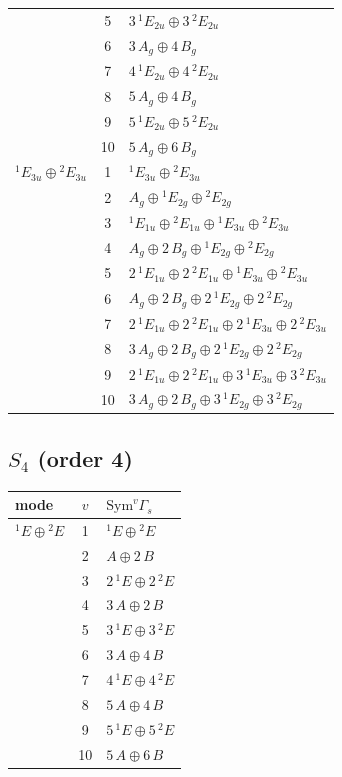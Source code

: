 \documentclass[11pt]{article}
\begin{document}
\begin{longtable}{l c p{}}
 & 5 & $3\,{}^{1}E_{2u}\oplus 3\,{}^{2}E_{2u}$\\
 & 6 & $3\,A_{g}\oplus 4\,B_{g}$\\
 & 7 & $4\,{}^{1}E_{2u}\oplus 4\,{}^{2}E_{2u}$\\
 & 8 & $5\,A_{g}\oplus 4\,B_{g}$\\
 & 9 & $5\,{}^{1}E_{2u}\oplus 5\,{}^{2}E_{2u}$\\
 & 10 & $5\,A_{g}\oplus 6\,B_{g}$\\
\hline
${}^{1}E_{3u}\oplus {}^{2}E_{3u}$ & 1 & ${}^{1}E_{3u}\oplus {}^{2}E_{3u}$\\
 & 2 & $A_{g}\oplus {}^{1}E_{2g}\oplus {}^{2}E_{2g}$\\
 & 3 & ${}^{1}E_{1u}\oplus {}^{2}E_{1u}\oplus {}^{1}E_{3u}\oplus {}^{2}E_{3u}$\\
 & 4 & $A_{g}\oplus 2\,B_{g}\oplus {}^{1}E_{2g}\oplus {}^{2}E_{2g}$\\
 & 5 & $2\,{}^{1}E_{1u}\oplus 2\,{}^{2}E_{1u}\oplus {}^{1}E_{3u}\oplus {}^{2}E_{3u}$\\
 & 6 & $A_{g}\oplus 2\,B_{g}\oplus 2\,{}^{1}E_{2g}\oplus 2\,{}^{2}E_{2g}$\\
 & 7 & $2\,{}^{1}E_{1u}\oplus 2\,{}^{2}E_{1u}\oplus 2\,{}^{1}E_{3u}\oplus 2\,{}^{2}E_{3u}$\\
 & 8 & $3\,A_{g}\oplus 2\,B_{g}\oplus 2\,{}^{1}E_{2g}\oplus 2\,{}^{2}E_{2g}$\\
 & 9 & $2\,{}^{1}E_{1u}\oplus 2\,{}^{2}E_{1u}\oplus 3\,{}^{1}E_{3u}\oplus 3\,{}^{2}E_{3u}$\\
 & 10 & $3\,A_{g}\oplus 2\,B_{g}\oplus 3\,{}^{1}E_{2g}\oplus 3\,{}^{2}E_{2g}$\\
\hline
\end{longtable}

\subsection*{$S_{4}$ \quad (order 4)}
\begin{longtable}{l c p{}}
\hline mode & $v$ & $\mathrm{Sym}^v\Gamma_s$\\ \hline\endhead
${}^{1}E\oplus {}^{2}E$ & 1 & ${}^{1}E\oplus {}^{2}E$\\
 & 2 & $A\oplus 2\,B$\\
 & 3 & $2\,{}^{1}E\oplus 2\,{}^{2}E$\\
 & 4 & $3\,A\oplus 2\,B$\\
 & 5 & $3\,{}^{1}E\oplus 3\,{}^{2}E$\\
 & 6 & $3\,A\oplus 4\,B$\\
 & 7 & $4\,{}^{1}E\oplus 4\,{}^{2}E$\\
 & 8 & $5\,A\oplus 4\,B$\\
 & 9 & $5\,{}^{1}E\oplus 5\,{}^{2}E$\\
 & 10 & $5\,A\oplus 6\,B$\\
\hline
\end{longtable}
\end{document}
